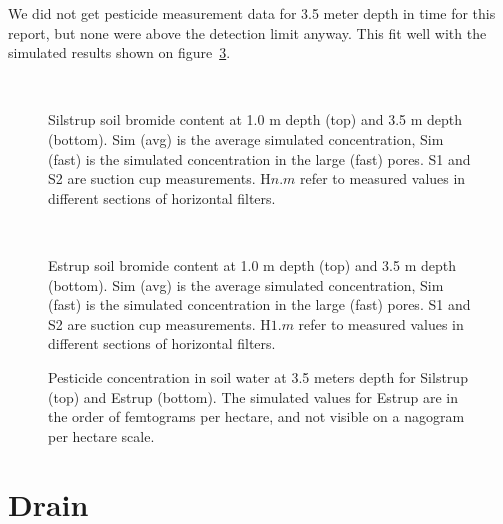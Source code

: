 We did not get pesticide measurement data for 3.5 meter depth in time
for this report, but none were above the detection limit anyway.  This
fit well with the simulated results shown on
figure~\ref{fig:pest-horizontal}.

\begin{figure}[htbp]
  \begin{center}
    \\
  \end{center}
  \caption{Silstrup soil bromide content at 1.0 m depth (top) and 3.5
    m depth (bottom).  Sim (avg) is the average simulated
    concentration, Sim (fast) is the simulated concentration in the
    large (fast) pores.  S1 and S2 are suction cup measurements.
    H$n$.$m$ refer to measured values in different sections of
    horizontal filters.}
  \label{fig:Silstrup-bromide}
\end{figure}

\begin{figure}[htbp]
  \begin{center}
    \\
  \end{center}
  \caption{Estrup soil bromide content at 1.0 m depth (top) and 3.5
    m depth (bottom).  Sim (avg) is the average simulated
    concentration, Sim (fast) is the simulated concentration in the
    large (fast) pores.  S1 and S2 are suction cup measurements.
    H$1$.$m$ refer to measured values in different sections of
    horizontal filters.}
  \label{fig:Estrup-bromide}
\end{figure}

\begin{figure}[htbp]
  \begin{center}
  \end{center}
  \caption{Pesticide concentration in soil water at 3.5 meters depth
    for Silstrup (top) and Estrup (bottom).  The simulated values for
    Estrup are in the order of femtograms per hectare, and not visible
    on a nagogram per hectare scale.}
  \label{fig:pest-horizontal}
\end{figure}

\FloatBarrier
\section{Drain}

